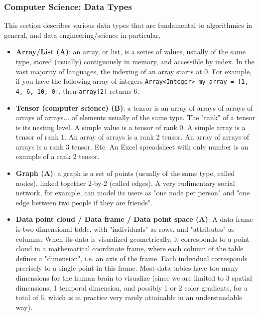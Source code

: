\documentclass{article}
\begin{document}
\subsubsection*{Computer Science: Data Types}

This section describes various data types that are fundamental to algorithmics in general, and data engineering/science in particular.

\begin{itemize}
    \item \textbf{Array/List (A)}: an array, or list, is a series of values, usually of the same type, stored (usually) contiguously in memory, and accessible by index. In the vast majority of languages, the indexing of an array starts at 0. For example, if you have the following array of integers \texttt{Array<Integer> my\_array = [1, 4, 6, 10, 0]}, then \texttt{array[2]} returns 6.
    
    \item \textbf{Tensor (computer science) (B)}: a tensor is an array of arrays of arrays of arrays of arrays... of elements usually of the same type. The "rank" of a tensor is its nesting level. A simple value is a tensor of rank 0. A simple array is a tensor of rank 1. An array of arrays is a rank 2 tensor. An array of arrays of arrays is a rank 3 tensor. Etc. An Excel spreadsheet with only number is an example of a rank 2 tensor.
    
    \item \textbf{Graph (A)}: a graph is a set of points (usually of the same type, called nodes), linked together 2-by-2 (called edges). A very rudimentary social network, for example, can model its users as "one node per person" and "one edge between two people if they are friends".
    
    \item \textbf{Data point cloud / Data frame / Data point space (A)}: A data frame is two-dimensional table, with "individuals" as rows, and "attributes" as columns. When its data is visualized geometrically, it corresponds to a point cloud in a mathematical coordinate frame, where each column of the table defines a "dimension", i.e. an axis of the frame. Each individual corresponds precisely to a single point in this frame. Most data tables have too many dimensions for the human brain to visualize (since we are limited to 3 spatial dimensions, 1 temporal dimension, and possibly 1 or 2 color gradients, for a total of 6, which is in practice very rarely attainable in an understandable way).
    

\end{itemize}
\end{document}
